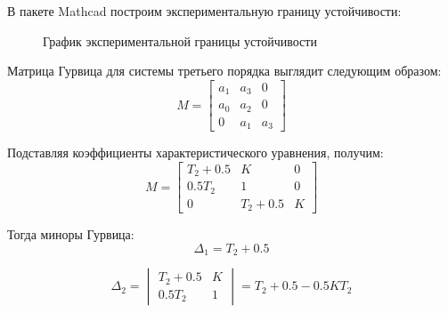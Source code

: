 \documentclass[a4paper, 11pt]{article}
\begin{document}
\par 
В пакете Mathcad построим экспериментальную границу устойчивости:

\begin{figure}[h!]
\caption{График экспериментальной границы устойчивости}
\label{ris:image}
\end{figure}

\par 
Матрица Гурвица для системы третьего порядка выглядит следующим образом:
\begin{equation}
M=
\begin{bmatrix}
a_1 & a_3 & 0 \\
a_0 & a_2 & 0 \\
0 & a_1 & a_3 
\end{bmatrix}
\end{equation}

\newpage
\par 
Подставляя коэффициенты характеристического уравнения, получим:
\begin{equation}
M=
\begin{bmatrix}
T_2+0.5 & K & 0 \\
0.5T_2 & 1 & 0 \\
0 & T_2+0.5 & K
\end{bmatrix}
\end{equation}

\par 
Тогда миноры Гурвица:
\begin{equation}
\Delta_1=T_2+0.5
\end{equation}

\begin{equation}
\Delta_2=
\begin{vmatrix}
T_2+0.5 & K \\
0.5T_2 & 1
\end{vmatrix} 
=T_2+0.5-0.5KT_2
\end{equation}
\end{document}
